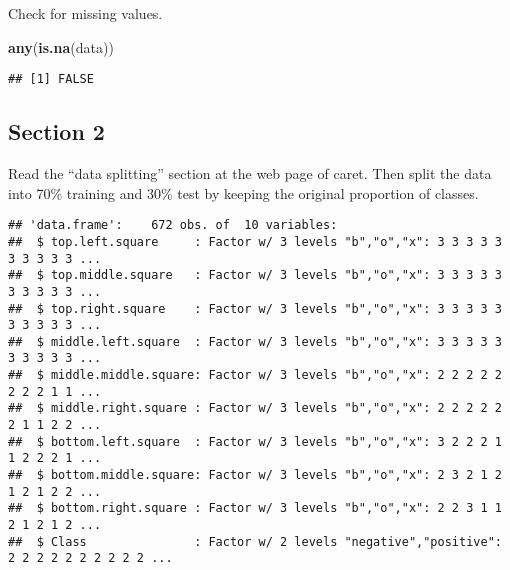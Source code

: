 \documentclass[]{article}
\newenvironment{Shaded}{\begin{snugshade}}{\end{snugshade}}
\newcommand{\DataTypeTok}[1]{\textcolor[rgb]{0.13,0.29,0.53}{#1}}
\newcommand{\DecValTok}[1]{\textcolor[rgb]{0.00,0.00,0.81}{#1}}
\newcommand{\KeywordTok}[1]{\textcolor[rgb]{0.13,0.29,0.53}{\textbf{#1}}}
\newcommand{\NormalTok}[1]{#1}
\newcommand{\OperatorTok}[1]{\textcolor[rgb]{0.81,0.36,0.00}{\textbf{#1}}}
\newcommand{\OtherTok}[1]{\textcolor[rgb]{0.56,0.35,0.01}{#1}}
\newcommand{\StringTok}[1]{\textcolor[rgb]{0.31,0.60,0.02}{#1}}
\begin{document}
Check for missing values.

\begin{Shaded}
\begin{Highlighting}[]
\KeywordTok{any}\NormalTok{(}\KeywordTok{is.na}\NormalTok{(data))}
\end{Highlighting}
\end{Shaded}

\begin{verbatim}
## [1] FALSE
\end{verbatim}

\hypertarget{section-2}{%
\subsection{Section 2}\label{section-2}}

Read the ``data splitting'' section at the web page of caret. Then split
the data into 70\% training and 30\% test by keeping the original
proportion of classes.

\begin{Shaded}
\end{Shaded}

\begin{verbatim}
## 'data.frame':    672 obs. of  10 variables:
##  $ top.left.square     : Factor w/ 3 levels "b","o","x": 3 3 3 3 3 3 3 3 3 3 ...
##  $ top.middle.square   : Factor w/ 3 levels "b","o","x": 3 3 3 3 3 3 3 3 3 3 ...
##  $ top.right.square    : Factor w/ 3 levels "b","o","x": 3 3 3 3 3 3 3 3 3 3 ...
##  $ middle.left.square  : Factor w/ 3 levels "b","o","x": 3 3 3 3 3 3 3 3 3 3 ...
##  $ middle.middle.square: Factor w/ 3 levels "b","o","x": 2 2 2 2 2 2 2 2 1 1 ...
##  $ middle.right.square : Factor w/ 3 levels "b","o","x": 2 2 2 2 2 2 1 1 2 2 ...
##  $ bottom.left.square  : Factor w/ 3 levels "b","o","x": 3 2 2 2 1 1 2 2 2 1 ...
##  $ bottom.middle.square: Factor w/ 3 levels "b","o","x": 2 3 2 1 2 1 2 1 2 2 ...
##  $ bottom.right.square : Factor w/ 3 levels "b","o","x": 2 2 3 1 1 2 1 2 1 2 ...
##  $ Class               : Factor w/ 2 levels "negative","positive": 2 2 2 2 2 2 2 2 2 2 ...
\end{verbatim}
\end{document}
